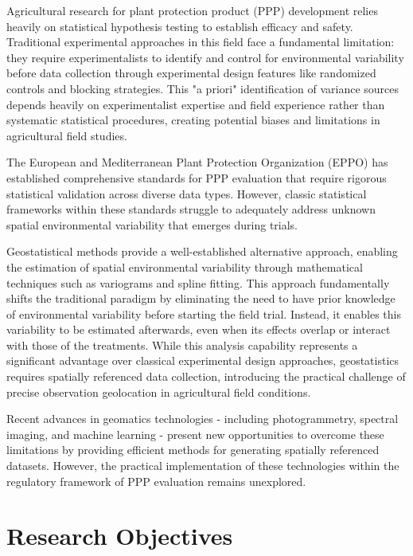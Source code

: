 \documentclass[12pt,a4paper,oneside]{report}
\begin{document}
Agricultural research for plant protection product (PPP) development relies heavily 
on statistical hypothesis testing to establish efficacy and safety. Traditional 
experimental approaches in this field face a fundamental limitation: they 
require experimentalists to identify and control for environmental variability 
before data collection through experimental design features like randomized 
controls and blocking strategies. This "a priori" identification of variance 
sources depends heavily on experimentalist expertise and field experience 
rather than systematic statistical procedures, creating potential biases and 
limitations in agricultural field studies.

The European and Mediterranean Plant Protection Organization (EPPO) has 
established comprehensive standards for PPP evaluation that require rigorous 
statistical validation across diverse data types. However, classic statistical 
frameworks within these standards struggle to adequately address unknown spatial 
environmental variability that emerges during trials.

Geostatistical methods provide a well-established alternative approach, enabling 
the estimation of spatial environmental variability through mathematical 
techniques such as variograms and spline fitting. 
This approach fundamentally shifts the traditional paradigm by eliminating the 
need to have prior knowledge of environmental variability before starting the 
field trial. Instead, it enables this variability to be estimated afterwards, 
even when its effects overlap or interact with those of the treatments. While 
this analysis capability represents a significant advantage over classical 
experimental design approaches, geostatistics requires spatially referenced data 
collection, introducing the practical challenge of precise observation 
geolocation in agricultural field conditions.

Recent advances in geomatics technologies - including photogrammetry, spectral 
imaging, and machine learning - present new opportunities to overcome these 
limitations by providing efficient methods for generating spatially referenced 
datasets. However, the practical implementation of these technologies within the 
regulatory framework of PPP evaluation remains unexplored.

\section{Research Objectives}
\end{document}
